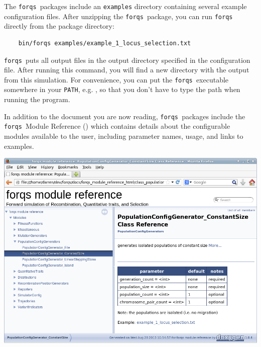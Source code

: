 \documentclass{article}
\newcommand{\forqs}[0]{\texttt{forqs }}
\begin{document}
The \forqs packages include an \texttt{examples} directory containing several
example configuration files.  After unzipping the \forqs package,
you can run \forqs directly from the package directory:
\begin{small}
\begin{verbatim}
    bin/forqs examples/example_1_locus_selection.txt
\end{verbatim}
\end{small}
\forqs puts all output files in the output directory specified in the
configuration file.  After running this command, you will find a new directory
 with the output from this simulation.
For convenience, you can put the \forqs executable somewhere in your
\texttt{PATH}, e.g. , so that you don't have to type the path when
running the program.

In addition to the document you are now reading, \forqs packages include the
\forqs Module Reference ()
which contains details about the configurable modules available to the user,
including parameter names, usage, and links to examples.

\begin{center}
\includegraphics[width=.9\textwidth]{fig/screenshot_forqs_module_reference.png}
\end{center}

\end{document}
